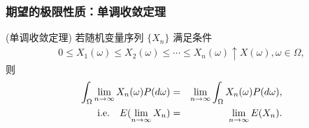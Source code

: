 	\begin{frame}
		\frametitle{期望的极限性质：单调收敛定理}
		\begin{thm}
			(单调收敛定理) 若随机变量序列 $\{X_n\}$ 满足条件
			\begin{eqnarray*}
				0\leq X_1(\omega)\leq X_2(\omega)\leq \cdots \leq X_n(\omega)\uparrow X(\omega), \omega\in \Omega,
			\end{eqnarray*}
			则
			\begin{eqnarray*}
				\int_{\Omega}\lim_{n\rightarrow\infty}X_n(\omega)P(d\omega)&=& \lim_{n\rightarrow\infty}\int_\Omega X_n(\omega)P(d\omega), \\
				{\rm i.e.} \quad    E(\lim_{n\rightarrow\infty}X_n)&=&\lim_{n\rightarrow\infty}E(X_n).
			\end{eqnarray*}

		\end{thm}

	\end{frame}

